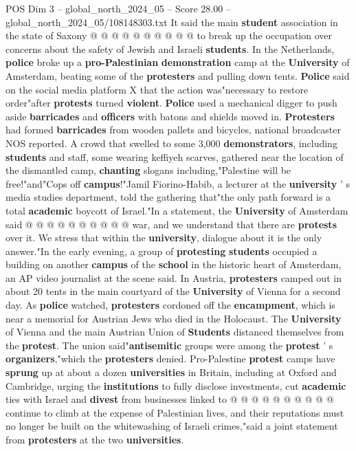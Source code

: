 \begin{textsample}{POS Dim 3 – global\_north\_2024\_05 – Score 28.00 – global\_north\_2024\_05/108148303.txt}
It said the main \textbf{student} association in the state of Saxony @ @ @ @ @ @ @ @ @ @ to break up the occupation over concerns about the safety of Jewish and Israeli \textbf{students}.
In the Netherlands, \textbf{police} broke up a \textbf{pro-Palestinian} \textbf{demonstration} camp at the \textbf{University} of Amsterdam, beating some of the \textbf{protesters} and pulling down tents. \textbf{Police} said on the social media platform X that the action was"necessary to restore order"after \textbf{protests} turned \textbf{violent}. \textbf{Police} used a mechanical digger to push aside \textbf{barricades} and \textbf{officers} with batons and shields moved in. \textbf{Protesters} had formed \textbf{barricades} from wooden pallets and bicycles, national broadcaster NOS reported.
A crowd that swelled to some 3,000 \textbf{demonstrators}, including \textbf{students} and staff, some wearing keffiyeh scarves, gathered near the location of the dismantled camp, \textbf{chanting} slogans including,"Palestine will be free!"and"Cops off \textbf{campus}!"Jamil Fiorino-Habib, a lecturer at the \textbf{university} ' s media studies department, told the gathering that"the only path forward is a total \textbf{academic} boycott of Israel."In a statement, the \textbf{University} of Amsterdam said @ @ @ @ @ @ @ @ @ @ war, and we understand that there are \textbf{protests} over it.
We stress that within the \textbf{university}, dialogue about it is the only answer."In the early evening, a group of \textbf{protesting} \textbf{students} occupied a building on another \textbf{campus} of the \textbf{school} in the historic heart of Amsterdam, an AP video journalist at the scene said.
In Austria, \textbf{protesters} camped out in about 20 tents in the main courtyard of the \textbf{University} of Vienna for a second day.
As \textbf{police} watched, \textbf{protesters} cordoned off the \textbf{encampment}, which is near a memorial for Austrian Jews who died in the Holocaust.
The \textbf{University} of Vienna and the main Austrian Union of \textbf{Students} distanced themselves from the \textbf{protest}.
The union said"\textbf{antisemitic} groups were among the \textbf{protest} ' s \textbf{organizers},"which the \textbf{protesters} denied.
Pro-Palestine \textbf{protest} camps have \textbf{sprung} up at about a dozen \textbf{universities} in Britain, including at Oxford and Cambridge, urging the \textbf{institutions} to fully disclose investments, cut \textbf{academic} ties with Israel and \textbf{divest} from businesses linked to @ @ @ @ @ @ @ @ @ @ continue to climb at the expense of Palestinian lives, and their reputations must no longer be built on the whitewashing of Israeli crimes,"said a joint statement from \textbf{protesters} at the two \textbf{universities}.

\end{textsample}
